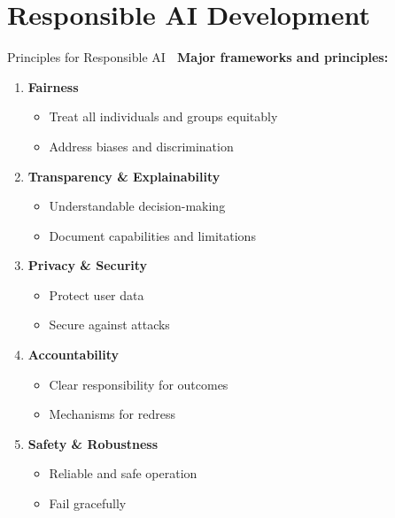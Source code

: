 \documentclass[aspectratio=169]{beamer}
\begin{document}
\section{Responsible AI Development}

\begin{frame}[shrink=10]{Principles for Responsible AI 📜}
\textbf{Major frameworks and principles:}

\vspace{0.5em}

\begin{enumerate}\setlength{\itemsep}{0pt}
    \item \textbf{Fairness}
    \begin{itemize}\setlength{\itemsep}{0pt}
        \item Treat all individuals and groups equitably
        \item Address biases and discrimination
    \end{itemize}

    \item \textbf{Transparency \& Explainability}
    \begin{itemize}\setlength{\itemsep}{0pt}
        \item Understandable decision-making
        \item Document capabilities and limitations
    \end{itemize}

    \item \textbf{Privacy \& Security}
    \begin{itemize}\setlength{\itemsep}{0pt}
        \item Protect user data
        \item Secure against attacks
    \end{itemize}

    \item \textbf{Accountability}
    \begin{itemize}\setlength{\itemsep}{0pt}
        \item Clear responsibility for outcomes
        \item Mechanisms for redress
    \end{itemize}

    \item \textbf{Safety \& Robustness}
    \begin{itemize}\setlength{\itemsep}{0pt}
        \item Reliable and safe operation
        \item Fail gracefully
    \end{itemize}


\end{enumerate}
\end{frame}
\end{document}
